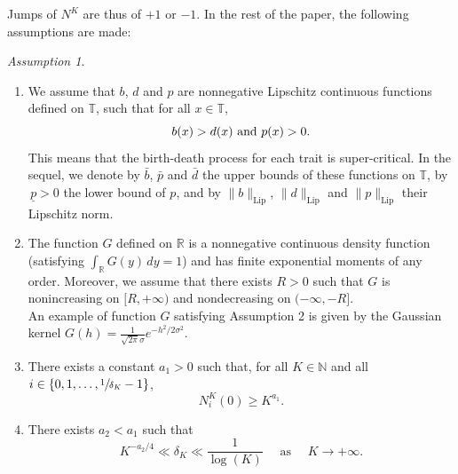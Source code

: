 \documentclass[JEP,XML,SOM,Unicode,published]{cedram}
\theoremstyle{plain}
\theoremstyle{remark}
\newtheorem{hyp}[theorem]{Assumption}
\newcommand\T{\mathbb{T}}
\newcommand\N{\mathbb{N}}
\newcommand\R{\mathbb{R}}
\begin{document}
{Jumps of $N^K$ are thus of $+1$ or $-1$. In the rest of the paper, the following assumptions are made:}

\skpt
\begin{hyp}\label{hypmodele}
\begin{enumerate}
\item\label{hypmodele1}
We assume that $b$, $d$ and $p$ are nonnegative Lipschitz continuous functions defined on $\T$, such that for all $x\in\T$,
\begin{equation*}%
b(x)>d(x) \hbox{ and } p(x)>0.
\end{equation*}
This means that the birth-death process for each trait is super-critical. In the sequel, we denote by $\bar{b}$, $\bar{p}$ and $\bar{d}$ the upper bounds of these functions on $\T$, by $\,\underline p>0$ the lower bound of $p$, and by $\|b\|_{\text{Lip}}$, $\|d\|_{\text{Lip}}$ and $\|p\|_{\text{Lip}}$ their Lipschitz norm.

\item\label{hypmodele2}
The function $G$ defined on $\mathbb{R}$ is a nonnegative continuous density function (satisfying $\int_\R G(y)\,dy=1$) and has finite exponential moments of any order. Moreover, we assume that there exists $R>0$ such that $G$ is nonincreasing on $[R,+\infty)$ and nondecreasing on $(-\infty,-R]$.\\
An example of function $G$ satisfying Assumption 2 is given by the Gaussian kernel $G(h)=\frac{1}{\sqrt{2\pi}\sigma}e^{-h^2/2\sigma^2}$.

\item\label{hypmodele3}
There exists a constant $a_1>0$ such that, for all $K\in \N$ and all $i\in\{0, 1,\dots, \sfrac{1}{\delta_K}-1\}$,
\begin{equation}\label{hyp:condinit}
N^K_i(0)\geq K^{a_1}.
\end{equation}

\item\label{hypmodele4}
There exists $a_2<a_1$ such that
\begin{equation}\label{hyp:deltaK}
K^{-a_2/4}\ll \delta_K\ll \frac{1}{\log(K)}\quad \mbox{ as }\quad K\to +\infty.
\end{equation}
\end{enumerate}
\end{hyp}
\end{document}
